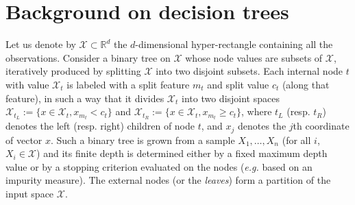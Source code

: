 \section{Background on decision trees}\label{ocrf:sec:background}
Let us denote by $\mathcal{X} \subset \mathbb{R}^d$ the $d$-dimensional  hyper-rectangle containing all the observations.
Consider a binary tree on $\mathcal{X}$ whose node values are subsets of $\mathcal{X}$, iteratively produced by splitting $\mathcal{X}$ into two disjoint subsets.
Each internal node $t$ with value $\mathcal{X}_t$ is labeled with a split feature $m_t$ and split value $c_t$ (along that feature), in such a way that it divides $\mathcal{X}_t$ into two disjoint spaces $\mathcal{X}_{t_L} := \{x \in \mathcal{X}_t, x_{m_t} < c_t \}$ and $\mathcal{X}_{t_R} := \{x \in \mathcal{X}_t, x_{m_t} \ge c_t \}$, where $t_L$ (resp. $t_R$) denotes the left (resp. right) children of node $t$, and $x_j$ denotes the $j$th coordinate of vector $x$. Such a binary tree is grown from a sample $ X_1, \ldots,  X_n$ (for all $i$, $ X_i \in \mathcal{X}$) and its finite depth is determined either by a fixed maximum depth value or by a stopping criterion evaluated on the nodes (\textit{e.g.} based on an impurity measure).
The external nodes (or the \emph{leaves}) form a partition of the input space $\mathcal{X}$.

